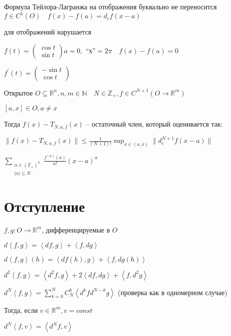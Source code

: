 \documentclass{book}
\newcommand\N{\ensuremath{\mathbb{N}}}
\newcommand\R{\ensuremath{\mathbb{R}}}
\newcommand\Z{\ensuremath{\mathbb{Z}}}
\newcommand{\p}[1]{#1^{\prime}}
\theoremstyle{definition}
\begin{document}
    Формула Тейлора-Лагранжа на отображения буквально не переносится
    $f\in C^1(O)\quad f(x) - f(a) = d_c f(x-a)$

    для отображений нарушается

    $f(t) = \begin{pmatrix} \cos t\\ \sin t \end{pmatrix} a = 0, $ ``х''$ = 2\pi \quad f(x) - f(a) = 0$

    $\p f(t) = \begin{pmatrix} -\sin t\\ \cos t \end{pmatrix} $


    \begin{theorem}
        Открытое $O\subseteq  \R^n, n, m \in \N \quad N \in \Z_+, f\in C^{N+1}\left( O \to  \R^m \right)$

        $ [a,x]\in O, a\neq x$

        Тогда $f(x) - T_{N, a, f}(x)$ -- остаточный член, который оценивается так:

        $\|f(x) - T_{N, a, f}(x)\| \leqslant \frac{1}{(N+1)!}\sup_{x\in (a,x)}\| d_c^{N+1}f(x-a)\|$

        $\sum_{\substack{\alpha\in \left( \Z _+ \right) ^n \\ |\alpha|\leqslant N}} \frac{f^{(\alpha)}(a)}{\alpha!}(x-a)^{\alpha}$
    \end{theorem}
    
    \section{Отступление}

    $f, g: O \to  \R^m$, дифференцируемые в $O$

     $d \left<f, g \right> = \left<df, g \right> + \left<f, dg \right>$

     $d \left<f, g \right>(h) = \left<df(h), g \right> + \left<f, dg(h) \right>$


     $d^2\left<f, g \right> = \left<d^2f, g \right> + 2\left<df, dg \right> + \left<f, d^2 g \right>$

     $d^N\left<f, g \right> = \sum_{k=0}^{N} C_N^k\left< d^kfd^{N-k}g\right>$ (проверка как в одномерном случае)

     Тогда, если $v\in \R^m, v = const$

     $d^N\left<f, v \right> = \left<d^Nf, v \right>$
    
\end{document}
